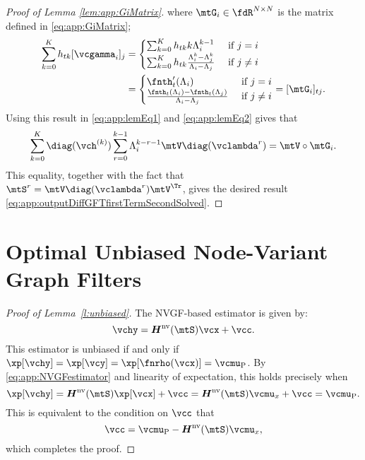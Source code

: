 \begin{proof}[Proof of Lemma \ref{lem:app:GiMatrix}]
%
where $\mtG_{i} \in \fdR^{N \times N}$ is the matrix defined in \eqref{eq:app:GiMatrix};
%
\begin{equation}
%
\begin{aligned}
    \sum_{k=0}^{K} h_{tk} [\vcgamma_{i}]_{j} & = \begin{cases}
        \sum_{k=0}^{K} h_{tk}k \lambda_{i}^{k-1} & \text{ if }j=i \\
        \sum_{k=0}^{K} h_{tk}\frac{\lambda_{i}^{k} - \lambda_{j}^{k}}{\lambda_{i}-\lambda_{j}} & \text{ if } j \neq i
    \end{cases}
    \\ & =
    \begin{cases}
        \fnth_{t}'(\lambda_{i}) & \text{ if }j=i \\
        \frac{\fnth_{t}(\lambda_{i})-\fnth_{t}(\lambda_{j})}{\lambda_{i}-\lambda_{j}} & \text{ if } j \neq i
    \end{cases}
    = [\mtG_{i}]_{tj}.
\end{aligned}
%
\end{equation}
Using this result in \eqref{eq:app:lemEq1} and \eqref{eq:app:lemEq2} gives that
\begin{equation}
    \sum_{k=0}^{K} \diag(\vch^{(k)}) \sum_{r=0}^{k-1}\lambda_{i}^{k-r-1}\mtV \diag(\vclambda^{r}) = \mtV \circ \mtG_{i}.
\end{equation}
This equality, together with the fact that $\mtS^{r} = \mtV \diag(\vclambda^{r}) \mtV^{\Tr}$, gives the desired result \eqref{eq:app:outputDiffGFTfirstTermSecondSolved}.
\end{proof}


\section{Optimal Unbiased Node-Variant Graph Filters}

\begin{proof}[Proof of Lemma~\ref{l:unbiased}]
The NVGF-based estimator is given by:
\begin{equation} \label{eq:app:NVGFestimator}
    \vchy = \mtfnH^{\text{nv}}(\mtS) \vcx + \vcc.
\end{equation}
%
This estimator is unbiased if and only if $\xp[\vchy] = \xp[\vcy] = \xp[\fnrho(\vcx)] = \vcmu_{\rho}$. By \eqref{eq:app:NVGFestimator} and linearity of expectation, this holds precisely when
%
\begin{equation}
    \xp[\vchy] = \mtfnH^{\text{nv}}(\mtS) \xp[\vcx] + \vcc = \mtfnH^{\text{nv}}(\mtS) \vcmu_{x} + \vcc = \vcmu_{\rho}.
\end{equation}
%
This is equivalent to the condition on $\vcc$ that
%
\begin{equation}
    \vcc = \vcmu_{\rho} - \mtfnH^{\text{nv}}(\mtS)\vcmu_{x},
\end{equation}
%
which completes the proof.
\end{proof}

